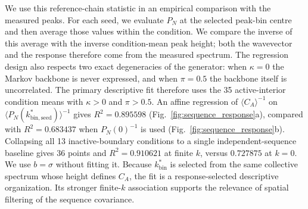 
We use this reference-chain statistic in an empirical comparison with the measured peaks. For each seed, we evaluate $P_N$ at the selected peak-bin centre and then average those values within the condition. We compare the inverse of this average with the inverse condition-mean peak height; both the wavevector and the response therefore come from the measured spectrum. The regression design also respects two exact degeneracies of the generator: when $\kappa=0$ the Markov backbone is never expressed, and when $\pi=0.5$ the backbone itself is uncorrelated. The primary descriptive fit therefore uses the 35 active-interior condition means with $\kappa>0$ and $\pi>0.5$. An affine regression of $\langle C_A\rangle^{-1}$ on $\langle P_N(k_{\mathrm{bin,seed}}^*)\rangle^{-1}$ gives $R^2=0.895598$ (Fig.~\ref{fig:sequence_response}a), compared with $R^2=0.683437$ when $P_N(0)^{-1}$ is used (Fig.~\ref{fig:sequence_response}b). Collapsing all 13 inactive-boundary conditions to a single independent-sequence baseline gives 36 points and $R^2=0.910621$ at finite $k$, versus $0.727875$ at $k=0$. We use $b=\sigma$ without fitting it. Because $k_{\mathrm{bin}}^*$ is selected from the same collective spectrum whose height defines $C_A$, the fit is a response-selected descriptive organization. Its stronger finite-$k$ association supports the relevance of spatial filtering of the sequence covariance.

